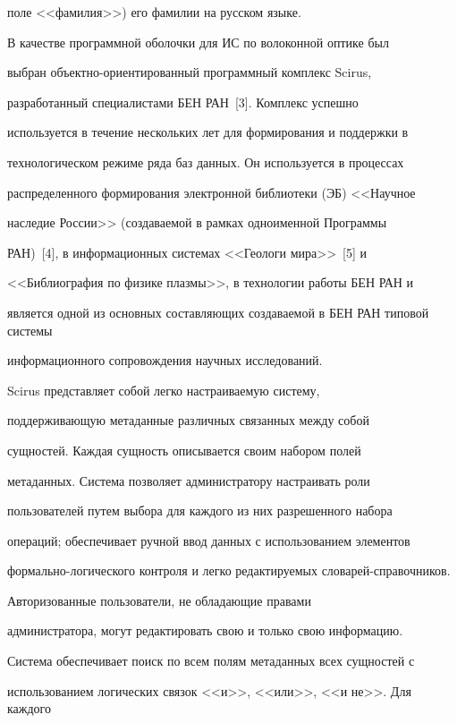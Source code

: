 поле <<фамилия>>) его фамилии на русском языке. 


    


    В качестве программной оболочки для ИС по волоконной оптике был 


выбран объектно-ориентированный программный комплекс Scirus, 


разработанный специалистами БЕН РАН~[3]. Комплекс успешно 


используется в течение нескольких лет для формирования и поддержки в 


технологическом режиме ряда баз данных. Он используется в процессах 


распределенного формирования электронной библиотеки (ЭБ) <<Научное 


наследие России>> (создаваемой в рамках одноименной Программы 


РАН)~[4], в информационных системах <<Геологи мира>>~[5] и 


<<Биб\-лио\-гра\-фия по физике плазмы>>, в технологии работы БЕН РАН и 


является одной из основных составляющих создаваемой в БЕН РАН типовой системы 


информационного сопровождения научных исследований. 


    


    Scirus представляет собой легко настраиваемую систему, 


поддерживающую метаданные различных связанных между собой 


сущностей. Каждая сущность описывается своим набором полей 


метаданных. Система позволяет администратору настраивать роли 


пользователей путем выбора для каждого из них разрешенного набора 


операций; обеспечивает ручной ввод данных с использованием элементов 


фор\-маль\-но-ло\-ги\-че\-ско\-го контроля и легко редактируемых сло\-ва\-рей-спра\-воч\-ни\-ков. 


Авторизованные пользователи, не обладающие правами 


администратора, могут редактировать свою и только свою информацию. 


Система обеспечивает поиск по всем полям метаданных всех сущностей с 


использованием логических связок <<и>>, <<или>>, <<и не>>. Для каждого 


